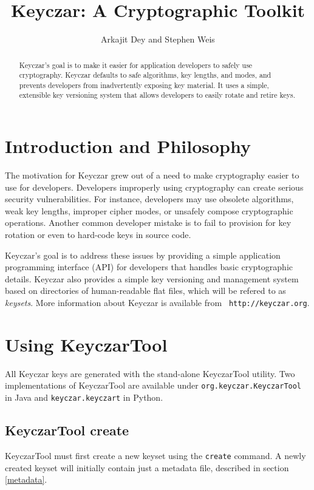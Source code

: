 \documentclass{llncs}
\title{Keyczar: A Cryptographic Toolkit}
\author{Arkajit Dey\inst{1} and Stephen Weis\inst{2}}
\institute{Massachusetts Institute of Technology, Cambridge, MA, USA 02139
\and
Google Inc., Mountain View, CA, USA 94043}
\begin{document}
\maketitle

\begin{abstract}
Keyczar's goal is to make it easier for application developers to safely use
cryptography. Keyczar defaults to safe algorithms, key lengths, and
modes, and prevents developers from inadvertently exposing key material. It
uses a simple, extensible key versioning system that allows developers to
easily rotate and retire keys.
\end{abstract}

\section{Introduction and Philosophy}

The motivation for Keyczar grew out of a need to make cryptography easier to
use for developers. Developers improperly using cryptography can create
serious security vulnerabilities. For instance, developers may use obsolete
algorithms, weak key lengths, improper cipher modes, or unsafely compose
cryptographic operations. Another common developer mistake is to fail to
provision for key rotation or even to hard-code keys in source code.

Keyczar's goal is to address these issues by providing a simple application
programming interface (API) for developers that handles basic cryptographic
details. Keyczar also provides a simple key versioning and management system
based on directories of human-readable flat files, which will be refered to as
\emph{keysets}. More information about Keyczar is available from {\tt
http://keyczar.org}.

\section{Using KeyczarTool}\label{keytool}

All Keyczar keys are generated with the stand-alone 
KeyczarTool utility. Two implementations of KeyczarTool are available under
{\tt org.keyczar.KeyczarTool} in Java and {\tt keyczar.keyczart} in Python.

\subsection{KeyczarTool create}
KeyczarTool must first create a new keyset using the {\tt create} command. A
newly created keyset will initially contain just a metadata file, described in
section \ref{metadata}.
\end{document}
